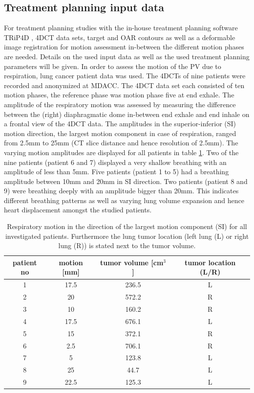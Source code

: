 \documentclass[type=dr, dr=rernat, accentcolor=tud7b,colorbacktitle, bigchapter, openright, twoside, 12pt ]{tudthesis}
\begin{document}
\subsection{Treatment planning input data}
For treatment planning studies with the in-house treatment planning software TRiP4D \cite{Ric13}, 4DCT data sets, target and OAR contours as 
well as a deformable image registration for motion assessment in-between the different motion phases are needed. Details on the used 
input data as well as the used treatment planning parameters will be given.\newline 
\newline
In order to assess the motion of the PV due to respiration, lung cancer patient data was used. The 4DCTs of nine patients were recorded and 
anonymized at MDACC. The 4DCT data set each consisted of ten motion phases, the reference phase was 
motion phase five at end exhale. The amplitude of the respiratory motion was assessed by measuring the difference between the (right) diaphragmatic dome in-between 
end exhale and end inhale on a frontal view of the 4DCT data. The amplitudes in the superior-inferior (SI) motion direction, the 
largest motion component in case of respiration, ranged from 2.5mm to 25mm (CT slice distance and hence resolution of 2.5mm). The varying 
motion amplitudes are displayed for all patients in 
table \ref{tab:patdata}. Two of the nine patients (patient 6 and 7) displayed a very shallow breathing with an amplitude of less than 5mm. 
Five patients (patient 1 to 5) had a breathing amplitude between 10mm and 20mm in SI direction. Two patients (patient 8 and 9) were breathing 
deeply with an amplitude bigger than 20mm. This indicates different breathing patterns as well as varying lung volume 
expansion and hence heart displacement amongst the studied patients. 

\vspace*{-0.3cm}

\begin{table}[H]
  \centering
  \caption{Respiratory motion in the direction of the largest motion component (SI) for all investigated patients. Furthermore the lung tumor 
  location (left lung (L) or right lung (R)) is stated next to the tumor volume.}
  \begin{tabular}{|c|c|c|c|}
    \hline\hline
    patient no & motion [mm] & tumor volume [cm$^{3}$] & tumor location (L/R)\\
    \hline
    1 & 17.5 & 236.5 & L \\
    2 & 20 & 572.2 & R \\
    3 & 10 & 160.2 & R \\
    4 & 17.5 & 676.1 & L \\
    5 & 15 & 372.1 & R \\
    6 & 2.5 & 706.1 & R \\
    7 & 5 & 123.8 & L \\
    8 & 25 & 44.7 & L \\
    9 & 22.5 & 125.3 & L \\
    \hline\hline
  \end{tabular}
  \label{tab:patdata}
\end{table}
\end{document}
